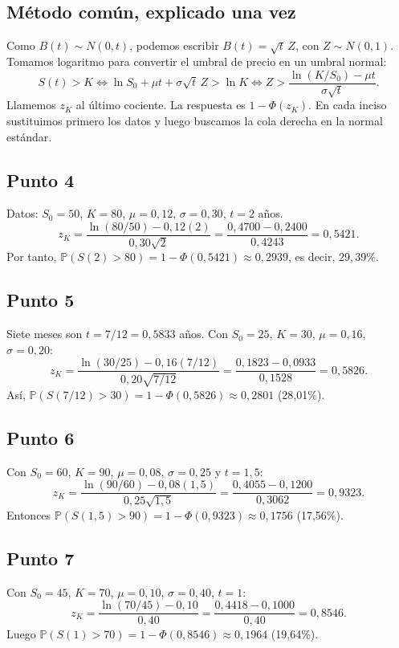 \documentclass[11pt,a4paper]{article}
\begin{document}
\subsection*{Método común, explicado una vez}
Como \(B(t)\sim N(0,t)\), podemos escribir \(B(t)=\sqrt{t}\,Z\), con \(Z\sim N(0,1)\). Tomamos logaritmo para convertir el umbral de precio en un umbral normal:
\[
S(t)>K
\Longleftrightarrow
\ln S_0+\mu t+\sigma\sqrt{t}\,Z>\ln K
\Longleftrightarrow
Z>\frac{\ln(K/S_0)-\mu t}{\sigma\sqrt{t}}.
\]
Llamemos \(z_K\) al último cociente. La respuesta es \(1-\Phi(z_K)\). En cada inciso sustituimos primero los datos y luego buscamos la cola derecha en la normal estándar.

\subsection*{Punto 4}
Datos: \(S_0=50\), \(K=80\), \(\mu=0{,}12\), \(\sigma=0{,}30\), \(t=2\) años.
\[
z_K=\frac{\ln(80/50)-0{,}12(2)}{0{,}30\sqrt2}
=\frac{0{,}4700-0{,}2400}{0{,}4243}=0{,}5421.
\]
Por tanto, \(\mathbb{P}(S(2)>80)=1-\Phi(0{,}5421)\approx\boxed{0{,}2939}\), es decir, \(29{,}39\%\).

\subsection*{Punto 5}
Siete meses son \(t=7/12=0{,}5833\) años. Con \(S_0=25\), \(K=30\), \(\mu=0{,}16\), \(\sigma=0{,}20\):
\[
z_K=\frac{\ln(30/25)-0{,}16(7/12)}{0{,}20\sqrt{7/12}}
=\frac{0{,}1823-0{,}0933}{0{,}1528}=0{,}5826.
\]
Así, \(\mathbb{P}(S(7/12)>30)=1-\Phi(0{,}5826)\approx\boxed{0{,}2801}\) (28,01\%).

\subsection*{Punto 6}
Con \(S_0=60\), \(K=90\), \(\mu=0{,}08\), \(\sigma=0{,}25\) y \(t=1{,}5\):
\[
z_K=\frac{\ln(90/60)-0{,}08(1{,}5)}{0{,}25\sqrt{1{,}5}}
=\frac{0{,}4055-0{,}1200}{0{,}3062}=0{,}9323.
\]
Entonces \(\mathbb{P}(S(1{,}5)>90)=1-\Phi(0{,}9323)\approx\boxed{0{,}1756}\) (17,56\%).

\subsection*{Punto 7}
Con \(S_0=45\), \(K=70\), \(\mu=0{,}10\), \(\sigma=0{,}40\), \(t=1\):
\[
z_K=\frac{\ln(70/45)-0{,}10}{0{,}40}
=\frac{0{,}4418-0{,}1000}{0{,}40}=0{,}8546.
\]
Luego \(\mathbb{P}(S(1)>70)=1-\Phi(0{,}8546)\approx\boxed{0{,}1964}\) (19,64\%).
\end{document}

